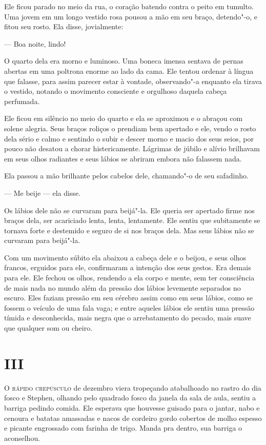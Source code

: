 Ele ficou parado no meio da rua, o coração batendo contra o peito em
tumulto. Uma jovem em um longo vestido rosa pousou a mão em seu braço,
detendo"-o, e fitou seu rosto. Ela disse, jovialmente:

 --- Boa noite, lindo!

O quarto dela era morno e luminoso. Uma boneca imensa sentava de pernas
abertas em uma poltrona enorme ao lado da cama. Ele tentou ordenar à
língua que falasse, para assim parecer estar à vontade, observando"-a
enquanto ela tirava o vestido, notando o movimento consciente e
orgulhoso daquela cabeça perfumada.

Ele ficou em silêncio no meio do quarto e ela se aproximou e o abraçou
com solene alegria. Seus braços roliços o prendiam bem apertado e ele,
vendo o rosto dela sério e calmo e sentindo o subir e descer morno e
macio dos seus seios, por pouco não desatou a chorar histericamente.
Lágrimas de júbilo e alívio brilhavam em seus olhos radiantes e seus
lábios se abriram embora não falassem nada.

Ela passou a mão brilhante pelos cabelos dele, chamando"-o de seu
safadinho.

 --- Me beije --- ela disse.

Os lábios dele não se curvaram para beijá"-la. Ele queria ser apertado
firme nos braços dela, ser acariciado lenta, lenta, lentamente. Ele
sentiu que subitamente se tornava forte e destemido e seguro de si nos
braços dela. Mas seus lábios não se curvaram para beijá"-la.

Com um movimento súbito ela abaixou a cabeça dele e o beijou, e seus
olhos francos, erguidos para ele, confirmaram a intenção dos seus
gestos. Era demais para ele. Ele fechou os olhos, rendendo a ela corpo
e mente, sem ter consciência de mais nada no mundo além da pressão dos
lábios levemente separados no escuro. Eles faziam pressão em seu
cérebro assim como em seus lábios, como se fossem o veículo de uma fala
vaga; e entre aqueles lábios ele sentiu uma pressão tímida e
desconhecida, mais negra que o arrebatamento do pecado, mais suave que
qualquer som ou cheiro.

\chapter{III}

\textsc{O rápido crepúsculo} de dezembro viera tropeçando atabalhoado no rastro
do dia fosco e Stephen, olhando pelo quadrado fosco da janela da sala
de aula, sentiu a barriga pedindo comida. Ele esperava que houvesse
guisado para o jantar, nabo e cenoura e batatas amassadas e nacos de
cordeiro gordo cobertos de molho espesso e picante engrossado com
farinha de trigo. Manda pra dentro, sua barriga o aconselhou.

